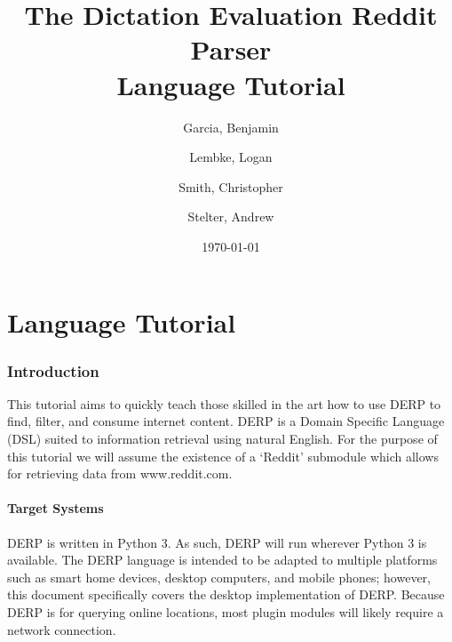 \documentclass{article}
\title{\textbf{The Dictation Evaluation Reddit Parser \\ Language Tutorial}}
\author{
Garcia, Benjamin \and
Lembke, Logan \and
Smith, Christopher \and
Stelter, Andrew
}
\date{\today}
\begin{document}
\maketitle %

\newpage
\tableofcontents




\newpage


\part{Language Tutorial}
\section{Introduction}
This tutorial aims to quickly teach those skilled in the art how to use DERP to find, filter, and consume internet content. DERP is a Domain Specific Language (DSL) suited to information retrieval using natural English. For the purpose of this tutorial we will assume the existence of a ‘Reddit’ submodule which allows for retrieving data from www.reddit.com.

\subsection{Target Systems}
DERP is written in Python 3. As such, DERP will run wherever Python 3 is available. The DERP language is intended to be adapted to multiple platforms such as smart home devices, desktop computers, and mobile phones; however, this document specifically covers the desktop implementation of DERP. Because DERP is for querying online locations, most plugin modules will likely require a network connection.




\end{document}
